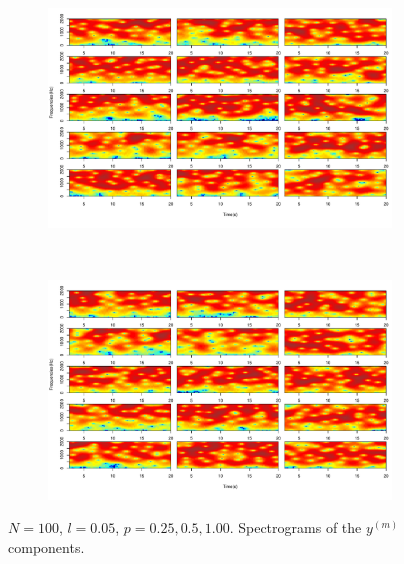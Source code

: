 \documentclass[11pt, a4paper]{article} %
\begin{document}
\begin{figure}
\begin{subfigure}{1.1\textwidth}
  \centering
  \includegraphics[width=\linewidth]{spectro_N100_l005_y_m_1_5.pdf}
  \label{fig:sfig1}
\end{subfigure}\\
\begin{subfigure}{1.1\textwidth}
  \centering
  \includegraphics[width=\linewidth]{spectro_N100_l005_y_m_6_10.pdf}
  \label{fig:sfig2}
\end{subfigure}
\label{fig1}
\caption{$N = 100$, $l = 0.05$, $p = 0.25, 0.5, 1.00$. Spectrograms of the $y^{(m)}$ components.}
\end{figure}

\restoregeometry


\end{document}
